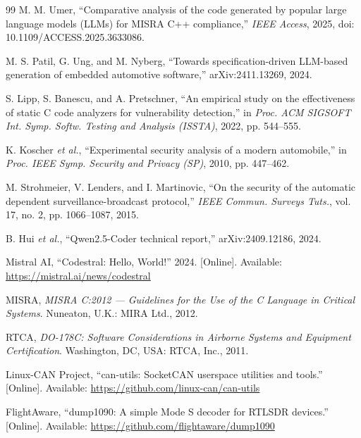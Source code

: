 \documentclass[12pt]{IEEEtran}
\begin{document}
\begin{thebibliography}{99}
M. M. Umer, ``Comparative analysis of the code generated by popular large language models (LLMs) for MISRA C++ compliance,'' \emph{IEEE Access}, 2025, doi: 10.1109/ACCESS.2025.3633086.

M. S. Patil, G. Ung, and M. Nyberg, ``Towards specification-driven LLM-based generation of embedded automotive software,'' arXiv:2411.13269, 2024.

S. Lipp, S. Banescu, and A. Pretschner, ``An empirical study on the effectiveness of static C code analyzers for vulnerability detection,'' in \emph{Proc. ACM SIGSOFT Int. Symp. Softw. Testing and Analysis (ISSTA)}, 2022, pp. 544--555.

K. Koscher \emph{et al.}, ``Experimental security analysis of a modern automobile,'' in \emph{Proc. IEEE Symp. Security and Privacy (SP)}, 2010, pp. 447--462.

M. Strohmeier, V. Lenders, and I. Martinovic, ``On the security of the automatic dependent surveillance-broadcast protocol,'' \emph{IEEE Commun. Surveys Tuts.}, vol. 17, no. 2, pp. 1066--1087, 2015.

B. Hui \emph{et al.}, ``Qwen2.5-Coder technical report,'' arXiv:2409.12186, 2024.

Mistral AI, ``Codestral: Hello, World!'' 2024. [Online]. Available: \url{https://mistral.ai/news/codestral}

MISRA, \emph{MISRA C:2012 --- Guidelines for the Use of the C Language in Critical Systems}. Nuneaton, U.K.: MIRA Ltd., 2012.

RTCA, \emph{DO-178C: Software Considerations in Airborne Systems and Equipment Certification}. Washington, DC, USA: RTCA, Inc., 2011.

Linux-CAN Project, ``can-utils: SocketCAN userspace utilities and tools.'' [Online]. Available: \url{https://github.com/linux-can/can-utils}

FlightAware, ``dump1090: A simple Mode S decoder for RTLSDR devices.'' [Online]. Available: \url{https://github.com/flightaware/dump1090}

\end{thebibliography}
\end{document}

